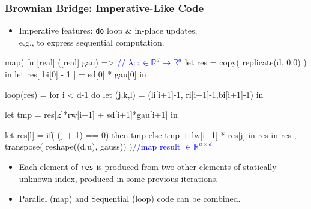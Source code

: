 \documentclass{beamer}
\newcommand{\blue}[1]{\textcolor{Blue}{{#1}}}
\newcommand{\emp}[1]{\textcolor{DikuRed}{ #1}}
\newcommand{\emphh}[1]{\textcolor{CosGreen}{ #1}}
\newcommand{\mymath}[1]{$ #1 $}
\newcommand{\myindu}[1]{^{#1}}
\newcommand{\mymathbb}[1]{\mathbb{#1}}
\begin{document}
\begin{frame}[fragile,t]
  \frametitle{Brownian Bridge: Imperative-Like Code}

\begin{itemize}
    \item Imperative features: {\tt do} loop \& in-place updates,\\
            e.g., to express sequential computation.\bigskip
\end{itemize}



\begin{colorcode}
  \emphh{map( fn [real] ([real] gau) => } \blue{// \mymath{\lambda :: \in \mymathbb{R}\myindu{d}\rightarrow \mymathbb{R}\myindu{d}}}
         let res = copy( replicate(d, 0.0) )   in
         let res[ bi[0] - 1 ] = sd[0] * gau[0] in

         \emp{loop(res) = for i < d-1 do}
           let (j,k,l) = (li[i+1]-1, ri[i+1]-1,bi[i+1]-1) in

           let tmp = \emp{res[k]}*rw[i+1] + sd[i+1]*gau[i+1]   in

           let \emp{res[l] =} if( (j + 1) == 0) then tmp
                        else tmp + lw[i+1] * \emp{res[j]}
           in  res
         in res
     \emphh{, transpose( reshape((d,u), gauss)) )}\blue{//map result \mymath{\in\mymathbb{R}\myindu{u\times{}d}}}
\end{colorcode}
\smallskip

\begin{itemize}
    \item Each element of {\tt res} is produced from two other elements of 
            statically-unknown index, produced in some previous iterations. 
    \item Parallel (map) and Sequential (loop) code can be combined. \bigskip
\end{itemize}

\end{frame}
\end{document}
